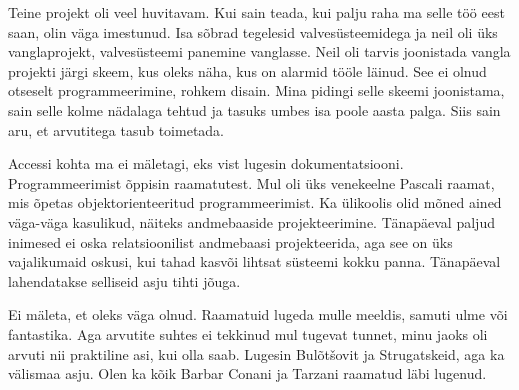 Teine projekt oli veel huvitavam. Kui sain teada, kui palju raha ma selle töö eest 
saan, olin väga imestunud. Isa sõbrad tegelesid valvesüsteemidega ja neil oli 
üks vanglaprojekt, valvesüsteemi panemine vanglasse. Neil oli 
tarvis joonistada vangla projekti järgi skeem, 
kus oleks näha, kus on alarmid tööle läinud. See ei olnud otseselt 
programmeerimine, rohkem disain. Mina pidingi selle skeemi
joonistama, sain selle kolme nädalaga tehtud ja tasuks
umbes isa poole aasta palga. Siis sain aru, et 
arvutitega tasub toimetada.


Accessi kohta ma ei mäletagi, eks vist lugesin dokumentatsiooni. 
Programmeerimist õppisin 
raamatutest. Mul oli üks venekeelne Pascali raamat, mis õpetas objektorienteeritud 
programmeerimist. Ka ülikoolis olid mõned ained väga-väga 
kasulikud, näiteks andmebaaside projekteerimine. Tänapäeval paljud 
inimesed ei oska relatsioonilist andmebaasi projekteerida, aga see on üks 
vajalikumaid oskusi, kui tahad kasvõi lihtsat süsteemi kokku 
panna. Tänapäeval lahendatakse selliseid asju tihti jõuga.


Ei mäleta, et oleks väga olnud. Raamatuid lugeda mulle meeldis, samuti
ulme või fantastika. Aga arvutite suhtes ei tekkinud mul tugevat
tunnet, minu jaoks oli arvuti nii praktiline asi, kui olla saab. Lugesin
Bulõtšovit ja Strugatskeid, aga ka 
välismaa asju. Olen ka kõik Barbar Conani ja Tarzani raamatud läbi lugenud.


